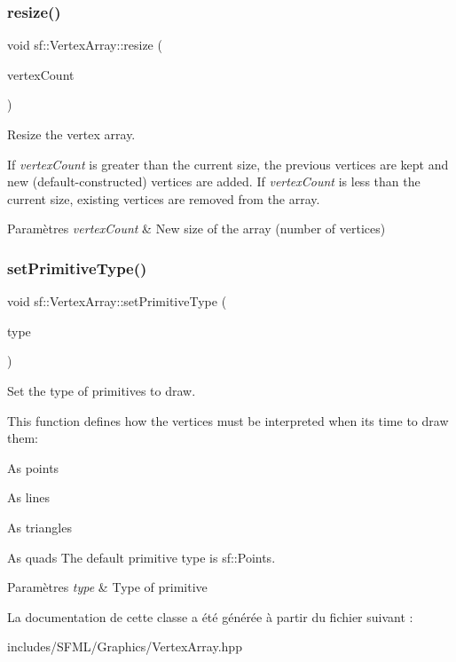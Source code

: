 \subsubsection{\texorpdfstring{resize()}{resize()}}
{\footnotesize\ttfamily void sf\+::\+Vertex\+Array\+::resize (\begin{DoxyParamCaption}\item[{std\+::size\+\_\+t}]{vertex\+Count }\end{DoxyParamCaption})}



Resize the vertex array. 

If {\itshape vertex\+Count} is greater than the current size, the previous vertices are kept and new (default-\/constructed) vertices are added. If {\itshape vertex\+Count} is less than the current size, existing vertices are removed from the array.


\begin{DoxyParams}{Paramètres}
{\em vertex\+Count} & New size of the array (number of vertices) \\
\hline
\end{DoxyParams}
\mbox{\label{classsf_1_1VertexArray_aa38c10707c28a97f4627ae8b2f3ad969}} 
\subsubsection{\texorpdfstring{set\+Primitive\+Type()}{setPrimitiveType()}}
{\footnotesize\ttfamily void sf\+::\+Vertex\+Array\+::set\+Primitive\+Type (\begin{DoxyParamCaption}\item[{\hyperlink{group__graphics_ga5ee56ac1339984909610713096283b1b}{Primitive\+Type}}]{type }\end{DoxyParamCaption})}



Set the type of primitives to draw. 

This function defines how the vertices must be interpreted when it\textquotesingle{}s time to draw them\+: \begin{DoxyItemize}
\item As points \item As lines \item As triangles \item As quads The default primitive type is sf\+::\+Points.\end{DoxyItemize}

\begin{DoxyParams}{Paramètres}
{\em type} & Type of primitive \\
\hline
\end{DoxyParams}


La documentation de cette classe a été générée à partir du fichier suivant \+:\begin{DoxyCompactItemize}
\item 
includes/\+S\+F\+M\+L/\+Graphics/Vertex\+Array.\+hpp\end{DoxyCompactItemize}
